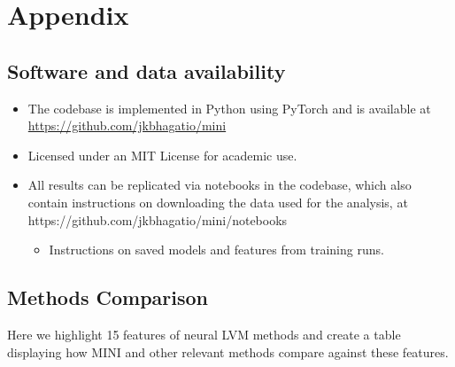 \section{Appendix}

\subsection{Software and data availability}

\begin{itemize}

    \item The codebase is implemented in Python using PyTorch and is available at \url{https://github.com/jkbhagatio/mini}
    
    \item Licensed under an MIT License for academic use.
    
    \item All results can be replicated via notebooks in the codebase, which also contain instructions on downloading the data used for the analysis, at https://github.com/jkbhagatio/mini/notebooks
    
    \begin{itemize}
        \item Instructions on saved models and features from training runs.
    \end{itemize}

\end{itemize}









\subsection{Methods Comparison}

Here we highlight 15 features of neural LVM methods and create a table displaying how MINI and other relevant methods compare against these features.

